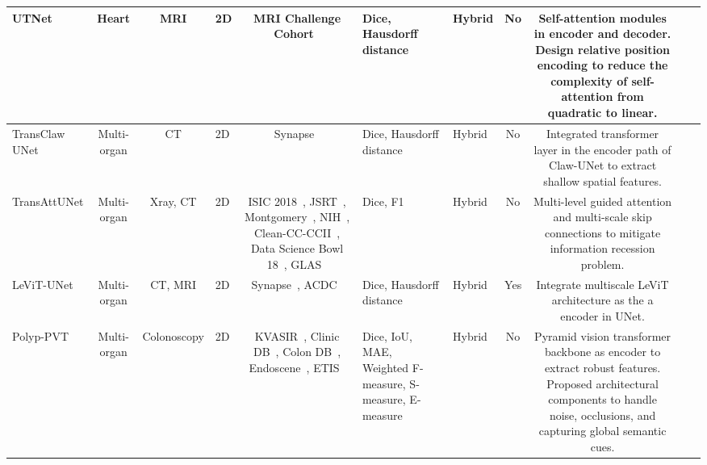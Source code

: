 \begin{table}[]
{\begin{adjustbox}{max width=1.2\textwidth}
\begin{tabular}{V{3}c|c|p{2.2cm}|c|p{3.5cm}|p{3cm}|c|c|p{11.5cm}V{3}}
UTNet\cite{gao2021utnet}           & Heart          & MRI                      & 2D            & MRI Challenge Cohort~\cite{campello2021multi}                                                               & Dice, Hausdorff distance                                     & Hybrid                & No   & Self-attention modules in encoder and decoder. Design relative position encoding to reduce the complexity of self-attention from quadratic to linear.                                                  \\ \hline
TransClaw UNet\cite{chang2021transclaw}  & Multi-organ    & CT                       & 2D            & Synapse~\cite{synapse}                                                                            & Dice, Hausdorff distance                                     & Hybrid                & No   & Integrated transformer layer in the encoder path of Claw-UNet to extract shallow spatial features.                                                                                                     \\ \hline
TransAttUNet\cite{chen2021transattunet}    & Multi-organ    & Xray, CT                 & 2D            & ISIC 2018~\cite{codella2019skin}, JSRT~\cite{shiraishi2000development}, Montgomery~\cite{jaeger2014two}, NIH~\cite{tang2019xlsor}, Clean-CC-CCII~\cite{he2020benchmarking}, Data Science Bowl 18~\cite{caicedo2019nucleus}, GLAS~\cite{sirinukunwattana2017gland}                         & Dice, F1                                                     & Hybrid                & No   & Multi-level guided attention and multi-scale skip connections to mitigate information recession problem.                                                                                               \\ \hline
LeViT-UNet\cite{xu2021levit}      & Multi-organ    & CT, MRI                  & 2D            & Synapse~\cite{synapse}, ACDC~\cite{bernard2018deep}                                                                       & Dice, Hausdorff distance                                     & Hybrid                & Yes  & Integrate multiscale LeViT architecture as the a encoder in UNet.                                                                                                                                      \\ \hline
Polyp-PVT\cite{dong2021polyp}       & Multi-organ    & Colonoscopy              & 2D            & KVASIR~\cite{jha2020kvasir}, Clinic DB~\cite{bernal2015wm}, Colon DB~\cite{tajbakhsh2015automated}, Endoscene~\cite{vazquez2017benchmark}, ETIS~\cite{silva2014toward}                                   & Dice, IoU, MAE, Weighted F-measure, S-measure, E-measure     & Hybrid                & No   & Pyramid vision transformer backbone as encoder to extract robust features. Proposed architectural components to handle noise, occlusions, and capturing global semantic cues.                          \\ \hline

\end{tabular}
\end{adjustbox}}
\end{table}

